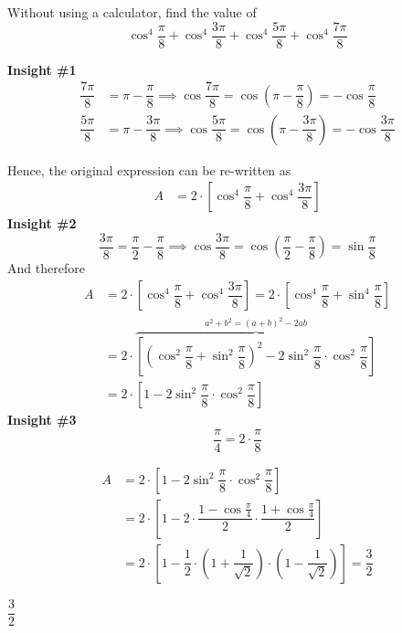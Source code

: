 
\question[4] Without using a calculator, find the value of 
\[ \cos^4\dfrac{\pi}{8} + \cos^4\dfrac{3\pi}{8} + \cos^4\dfrac{5\pi}{8} + \cos^4\dfrac{7\pi}{8} \] 


\ifprintanswers
\fi 

\begin{solution}[\fullpage]
    \textbf{Insight \#1}
    \begin{align}
      \dfrac{7\pi}{8} &= \pi-\dfrac\pi{8} \implies\cos\dfrac{7\pi}{8}=\cos\left(\pi-\dfrac\pi{8} \right) = -\cos\dfrac\pi{8} \\
      \dfrac{5\pi}{8} &= \pi-\dfrac{3\pi}{8} \implies\cos\dfrac{5\pi}{8}=\cos\left(\pi-\dfrac{3\pi}{8} \right) = -\cos\dfrac{3\pi}{8}
    \end{align}

    Hence, the original expression can be re-written as 
    \begin{align}
      A &= 2\cdot\left[ \cos^4\dfrac\pi{8} + \cos^4\dfrac{3\pi}{8} \right] 
    \end{align}
    \textbf{Insight \#2}
    \[ \dfrac{3\pi}{8} = \dfrac\pi{2} - \dfrac\pi{8} \implies \cos\dfrac{3\pi}{8} = \cos\left(\dfrac\pi{2}-\dfrac\pi{8} \right) = \sin\dfrac\pi{8} \]
    And therefore
    \begin{align}
      A &= 2\cdot\left[ \cos^4\dfrac\pi{8} + \cos^4\dfrac{3\pi}{8} \right] 
         = 2\cdot\left[ \cos^4\dfrac\pi{8} + \sin^4\dfrac{\pi}{8} \right]  \\
        &= 2\cdot\overbrace{\left[ \left(\cos^2\dfrac\pi{8}+\sin^2\dfrac\pi{8}\right)^2 
           - 2\sin^2\dfrac\pi{8}\cdot\cos^2\dfrac\pi{8}\right]}^{a^2+b^2=(a+b)^2-2ab} \\
        &= 2\cdot\left[ 1 - 2\sin^2\dfrac\pi{8}\cdot\cos^2\dfrac\pi{8}\right]
    \end{align}
    \textbf{Insight \#3}
    \[ \dfrac\pi{4} = 2\cdot\dfrac\pi{8} \] 

    \begin{align}
        A  &= 2\cdot\left[ 1 - 2\sin^2\dfrac\pi{8}\cdot\cos^2\dfrac\pi{8}\right] \\
           &= 2\cdot\left[1 - 2\cdot\dfrac{1-\cos\frac\pi{4}}{2}\cdot\dfrac{1+\cos\frac\pi{4}}{2} \right] \\
           &= 2\cdot\left[ 1-\dfrac{1}{2}\cdot\left( 1+\dfrac{1}{\sqrt{2}} \right)\cdot\left( 1-\dfrac{1}{\sqrt{2}} \right) \right] = \dfrac{3}{2}
    \end{align}
\end{solution}
\ifprintanswers\begin{codex}$\dfrac{3}{2}$\end{codex}\fi
